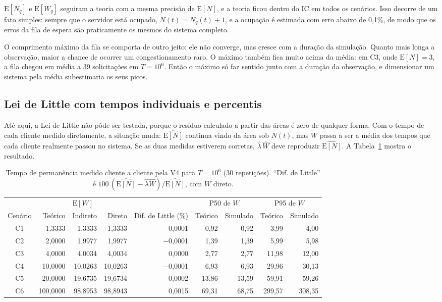 \documentclass[
  article,      %
  10pt,         %
  oneside,
  a4paper,
  twocolumn,    %
  english,
  brazil        %
]{abntex2}
\newcommand{\EN}{\mathrm{E}[N]}
\newcommand{\EW}{\mathrm{E}[W]}
\newcommand{\ENq}{\mathrm{E}[N_q]}
\newcommand{\EWq}{\mathrm{E}[W_q]}
\begin{document}
$\ENq$ e $\EWq$ seguiram a teoria com a mesma precisão de $\EN$, e a teoria ficou dentro do IC em todos os cenários. Isso decorre de um fato simples: sempre que o servidor está ocupado, $N(t)=N_q(t)+1$, e a ocupação é estimada com erro abaixo de 0,1\%, de modo que os erros da fila de espera são praticamente os mesmos do sistema completo.

O comprimento máximo da fila se comporta de outro jeito: ele não converge, mas cresce com a duração da simulação. Quanto mais longa a observação, maior a chance de ocorrer um congestionamento raro. O máximo também fica muito acima da média: em C3, onde $\EN=3$, a fila chegou em média a 39 solicitações em $T=10^6$. Então o máximo só faz sentido junto com a duração da observação, e dimensionar um sistema pela média subestimaria os seus picos.

\subsection{Lei de Little com tempos individuais e percentis}
\label{sec:little-direto}

Até aqui, a Lei de Little não pôde ser testada, porque o resíduo calculado a partir das áreas é zero de qualquer forma. Com o tempo de cada cliente medido diretamente, a situação muda: $\widehat{\EN}$ continua vindo da área sob $N(t)$, mas $W$ passa a ser a média dos tempos que cada cliente realmente passou no sistema. Se as duas medidas estiverem corretas, $\widehat{\lambda}\,\widehat{W}$ deve reproduzir $\widehat{\EN}$. A Tabela~\ref{tab:little-direto} mostra o resultado.

\begin{table}[t]
  \centering
  \caption{Tempo de permanência medido cliente a cliente pela V4 para $T=10^6$ (30 repetições). ``Dif. de Little'' é $100\,(\widehat{\EN}-\widehat{\lambda}\widehat{W})/\widehat{\EN}$, com $W$ direto.}
  \label{tab:little-direto}
  \small
  \begin{tabular}{crrrrrrrr}
    \toprule
    & \multicolumn{3}{c}{$\EW$} & & \multicolumn{2}{c}{P50 de $W$} & \multicolumn{2}{c}{P95 de $W$} \\
    \cmidrule(lr){2-4}\cmidrule(lr){6-7}\cmidrule(lr){8-9}
    Cenário & Teórico & Indireto & Direto & Dif. de Little (\%) & Teórico & Simulado & Teórico & Simulado \\
    \midrule
    C1 & 1,3333 & 1,3333 & 1,3333 & 0,0001 & 0,92 & 0,92 & 3,99 & 4,00 \\
    C2 & 2,0000 & 1,9977 & 1,9977 & $-$0,0001 & 1,39 & 1,39 & 5,99 & 5,98 \\
    C3 & 4,0000 & 4,0034 & 4,0034 & 0,0000 & 2,77 & 2,77 & 11,98 & 12,00 \\
    C4 & 10,0000 & 10,0263 & 10,0263 & $-$0,0001 & 6,93 & 6,93 & 29,96 & 30,13 \\
    C5 & 20,0000 & 19,6735 & 19,6734 & 0,0002 & 13,86 & 13,59 & 59,91 & 59,26 \\
    C6 & 100,0000 & 98,8953 & 98,8943 & 0,0015 & 69,31 & 68,75 & 299,57 & 308,35 \\
    \bottomrule
  \end{tabular}
\end{table}
\end{document}
